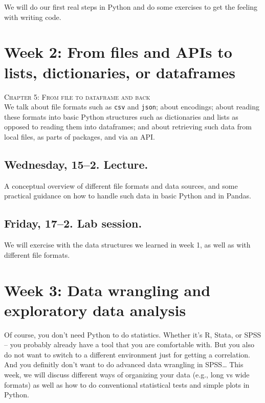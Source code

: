 We will do our first real steps in Python and do some exercises to get the feeling with writing code.



\section*{Week 2: From files and APIs to lists, dictionaries, or dataframes}
\textsc{ Chapter 5: From file to dataframe and back}\\

We talk about file formats such as \texttt{csv} and \texttt{json}; about encodings; about reading these formats into basic Python structures such as dictionaries and lists as opposed to reading them into dataframes; and about retrieving such data from local files, as parts of packages, and via an API.

\subsection*{Wednesday, 15--2. Lecture.}
A conceptual overview of different file formats and data sources, and some practical guidance on how to handle such data in basic Python and in Pandas.


\subsection*{Friday, 17--2. Lab session.}
We will exercise with the data structures we learned in week 1, as well as with different file formats.



\section*{Week 3: Data wrangling and exploratory data analysis}
Of course, you don't need Python to do statistics. Whether it's R, Stata, or SPSS -- you probably already have a tool that you are comfortable with. But you also do not want to switch to a different environment just for getting a correlation. And you definitly don't want to do advanced data wrangling in SPSS\ldots
This week, we will discuss different ways of organizing your data (e.g., long vs wide formats) as well as how to do conventional statistical tests and simple plots in Python.



